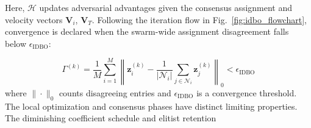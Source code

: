 \documentclass[lettersize,journal]{IEEEtran}
\begin{document}
Here, $\mathcal{H}$ updates adversarial advantages given the consensus assignment and velocity vectors $\mathbf{V}_i$, $\mathbf{V}_T$. Following the iteration flow in Fig.~\ref{fig:idbo_flowchart}, convergence is declared when the swarm-wide assignment disagreement falls below $\epsilon_{\mathrm{IDBO}}$:

\begin{equation}
\label{eq:convergence}
\Gamma^{(k)} = \frac{1}{M} \sum_{i=1}^{M} \left\| \mathbf{z}_i^{(k)} - \frac{1}{|\mathcal{N}_i|} \sum_{j \in \mathcal{N}_i} \mathbf{z}_j^{(k)} \right\|_0 < \epsilon_{\mathrm{IDBO}}
\end{equation}
where $\|\cdot\|_0$ counts disagreeing entries and $\epsilon_{\mathrm{IDBO}}$ is a convergence threshold.  
The local optimization and consensus phases have distinct limiting
properties. The diminishing coefficient schedule and elitist retention
\end{document}
